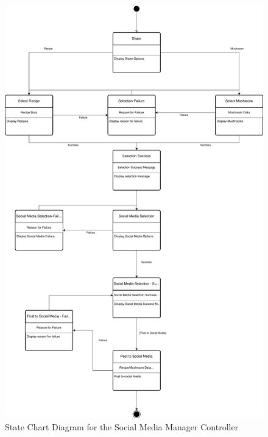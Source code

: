 \documentclass[]{article}
\begin{document}
\begin{figure}[h]
    \centering
    \includegraphics[width=\textwidth, height=0.9\textheight, keepaspectratio]{SocialMediaStateDiagram.pdf}
    \caption{State Chart Diagram for the Social Media Manager Controller}
\end{figure}

\clearpage
\end{document}
